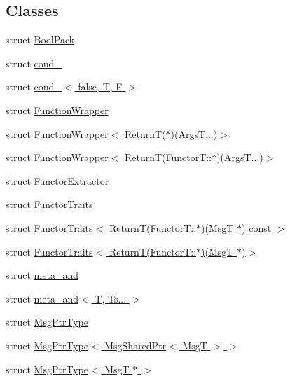 \subsection*{Classes}
\begin{DoxyCompactItemize}
\item 
struct \hyperlink{structvt_1_1util_1_1_bool_pack}{Bool\+Pack}
\item 
struct \hyperlink{structvt_1_1util_1_1cond__}{cond\+\_\+}
\item 
struct \hyperlink{structvt_1_1util_1_1cond___3_01false_00_01_t_00_01_f_01_4}{cond\+\_\+$<$ false, T, F $>$}
\item 
struct \hyperlink{structvt_1_1util_1_1_function_wrapper}{Function\+Wrapper}
\item 
struct \hyperlink{structvt_1_1util_1_1_function_wrapper_3_01_return_t_07_5_08_07_args_t_8_8_8_08_4}{Function\+Wrapper$<$ Return\+T($\ast$)(\+Args\+T...)$>$}
\item 
struct \hyperlink{structvt_1_1util_1_1_function_wrapper_3_01_return_t_07_functor_t_1_1_5_08_07_args_t_8_8_8_08_4}{Function\+Wrapper$<$ Return\+T(\+Functor\+T\+::$\ast$)(\+Args\+T...)$>$}
\item 
struct \hyperlink{structvt_1_1util_1_1_functor_extractor}{Functor\+Extractor}
\item 
struct \hyperlink{structvt_1_1util_1_1_functor_traits}{Functor\+Traits}
\item 
struct \hyperlink{structvt_1_1util_1_1_functor_traits_3_01_return_t_07_functor_t_1_1_5_08_07_msg_t_01_5_08_01const_01_4}{Functor\+Traits$<$ Return\+T(\+Functor\+T\+::$\ast$)(\+Msg\+T $\ast$) const $>$}
\item 
struct \hyperlink{structvt_1_1util_1_1_functor_traits_3_01_return_t_07_functor_t_1_1_5_08_07_msg_t_01_5_08_4}{Functor\+Traits$<$ Return\+T(\+Functor\+T\+::$\ast$)(\+Msg\+T $\ast$)$>$}
\item 
struct \hyperlink{structvt_1_1util_1_1meta__and}{meta\+\_\+and}
\item 
struct \hyperlink{structvt_1_1util_1_1meta__and_3_01_t_00_01_ts_8_8_8_01_4}{meta\+\_\+and$<$ T, Ts... $>$}
\item 
struct \hyperlink{structvt_1_1util_1_1_msg_ptr_type}{Msg\+Ptr\+Type}
\item 
struct \hyperlink{structvt_1_1util_1_1_msg_ptr_type_3_01_msg_shared_ptr_3_01_msg_t_01_4_01_4}{Msg\+Ptr\+Type$<$ Msg\+Shared\+Ptr$<$ Msg\+T $>$ $>$}
\item 
struct \hyperlink{structvt_1_1util_1_1_msg_ptr_type_3_01_msg_t_01_5_01_4}{Msg\+Ptr\+Type$<$ Msg\+T $\ast$ $>$}
\end{DoxyCompactItemize}
